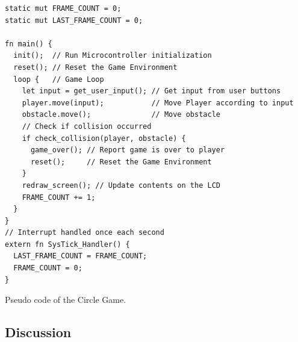 \begin{listing}[H]
  \begin{verbatim}
static mut FRAME_COUNT = 0;
static mut LAST_FRAME_COUNT = 0;

fn main() {
  init();  // Run Microcontroller initialization
  reset(); // Reset the Game Environment
  loop {   // Game Loop
    let input = get_user_input(); // Get input from user buttons
    player.move(input);           // Move Player according to input
    obstacle.move();              // Move obstacle
    // Check if collision occurred
    if check_collision(player, obstacle) {
      game_over(); // Report game is over to player
      reset();     // Reset the Game Environment
    }
    redraw_screen(); // Update contents on the LCD
    FRAME_COUNT += 1;
  }
}
// Interrupt handled once each second
extern fn SysTick_Handler() {
  LAST_FRAME_COUNT = FRAME_COUNT;
  FRAME_COUNT = 0;
}
  \end{verbatim}
  \caption{Pseudo code of the Circle Game.}
  \label{lst:game_loop}
\end{listing}

\subsection{Discussion}
